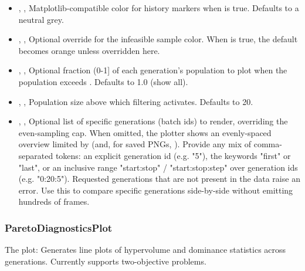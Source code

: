 \begin{itemize}
  \item {}, , Matplotlib-compatible color for history markers when  is true. Defaults to a neutral grey.
  \item {}, , Optional override for the infeasible sample color. When  is true, the default becomes orange unless overridden here.
  \item {}, , Optional fraction (0-1] of each generation's population to plot when the population exceeds . Defaults to 1.0 (show all).
  \item {}, , Population size above which  filtering activates. Defaults to 20.
  \item {}, , Optional list of specific generations (batch ids) to render, overriding the even-sampling cap. When omitted, the plotter shows an evenly-spaced overview limited by  (and, for saved PNGs, ). Provide any mix of comma-separated tokens: an explicit generation id (e.g. "5"), the keywords "first" or "last", or an inclusive range "start:stop" / "start:stop:step" over generation ids (e.g. "0:20:5"). Requested generations that are not present in the data raise an error. Use this to compare specific generations side-by-side without emitting hundreds of frames.
\end{itemize}

\subsubsection{ParetoDiagnosticsPlot}
The   plot: Generates line plots of hypervolume and dominance statistics across generations. Currently supports two-objective problems.

